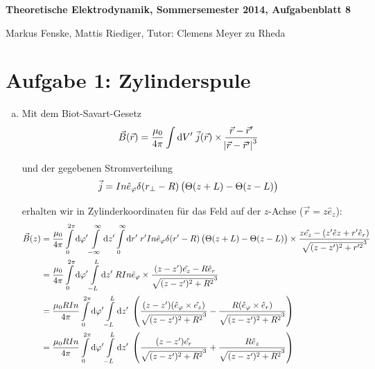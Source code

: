 \documentclass[a4paper,german,12pt,smallheadings]{scrartcl}
\begin{document}
\allowdisplaybreaks %
\begin{center}
\bfseries %
\sffamily %
\vspace{-40pt}
Theoretische Elektrodynamik, Sommersemester 2014, Aufgabenblatt 8

Markus Fenske, Mattis Riediger, Tutor: Clemens Meyer zu Rheda
\vspace{-10pt}
\end{center}

\section*{Aufgabe 1: Zylinderspule}
\begin{enumerate}[a)]
\item
Mit dem Biot-Savart-Gesetz
\begin{equation}
  \vec{B}(\vec{r}) = \frac{\mu_0}{4 \pi} \int \dif V' \; \vec{j}(\vec{r}) \times
  \frac{\vec{r} - \vec{r}'}{\envert{\vec{r} - \vec{r}'}^3}
\end{equation}

und der gegebenen Stromverteilung
\begin{equation}
  \vec{j} = I n \hat{e}_\varphi \delta(r_\perp - R) \del{
    \Theta(z+L) - \Theta(z-L)
  }
\end{equation}

erhalten wir in Zylinderkoordinaten für das Feld auf der $z$-Achse ($\vec{r} =
z \hat{e}_z$):
\begin{align*}
  \vec{B}(z)
  &= \frac{\mu_0}{4 \pi}
  \int\limits_0^{2 \pi} \dif \varphi'
  \int\limits_{-\infty}^{\infty} \dif z'
  \int\limits_{0}^{\infty} \dif r' \;
  r'
  I n \hat{e}_\varphi \delta(r' - R) \del{
    \Theta(z+L) - \Theta(z-L)
  }
  \times
  \frac{
    z \hat{e_z} - (z' \hat{e}z + r' \hat{e}_r)
  }{
    \sqrt{(z-z')^2 + r'^2}^3
  } \\
  &= \frac{\mu_0}{4 \pi}
  \int\limits_0^{2 \pi} \dif \varphi'
  \int\limits_{-L}^{L} \dif z' \;
  R
  I n \hat{e}_\varphi
  \times
  \frac{
    (z-z') \hat{e_z} - R \hat{e}_r
  }{
    \sqrt{(z-z')^2 + R^2}^3
  } \\
  &= \frac{\mu_0 R I n}{4 \pi}
  \int\limits_0^{2 \pi} \dif \varphi'
  \int\limits_{-L}^{L} \dif z' \;
  \del{
    \frac{
      (z-z') (\hat{e}_\varphi \times \hat{e_z})
    }{
      \sqrt{(z-z')^2 + R^2}^3
    }
    -
    \frac{
      R (\hat{e}_\varphi \times \hat{e}_r)
    }{
      \sqrt{(z-z')^2 + R^2}^3
    }
  } \\
  &= \frac{\mu_0 R I n}{4 \pi}
  \int\limits_0^{2 \pi} \dif \varphi'
  \int\limits_{-L}^{L} \dif z' \;
  \del{
    \frac{
      (z-z') \hat{e_r}
    }{
      \sqrt{(z-z')^2 + R^2}^3
    }
    +
    \frac{
      R \hat{e}_z
    }{
      \sqrt{(z-z')^2 + R^2}^3
    }
  }
\end{align*}


\end{enumerate}
\end{document}
